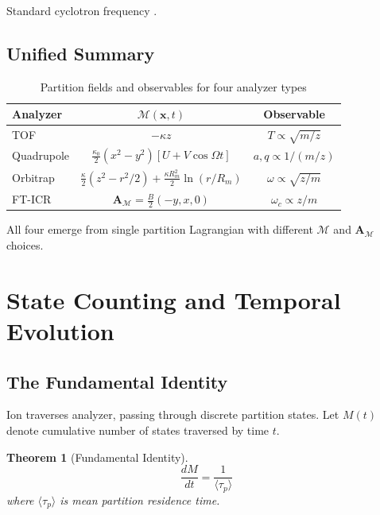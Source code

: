 \documentclass[twocolumn,10pt]{revtex4-2}
\newtheorem{theorem}{Theorem}[section]
\theoremstyle{definition}
\theoremstyle{remark}
\newcommand{\Mdepth}{\mathcal{M}}
\newcommand{\Apartition}{\mathbf{A}_{\Mdepth}}
\newcommand{\taup}{\tau_p}
\begin{document}
\noindent Standard cyclotron frequency \cite{Marshall1998}.

\subsection{Unified Summary}

\begin{table}[h]
\centering
\caption{Partition fields and observables for four analyzer types}
\label{tab:analyzers}
\begin{tabular}{lcc}
\toprule
\textbf{Analyzer} & \textbf{$\Mdepth(\mathbf{x}, t)$} & \textbf{Observable} \\
\midrule
TOF & $-\kappa z$ & $T \propto \sqrt{m/z}$ \\
Quadrupole & $\frac{\kappa_0}{2}(x^2-y^2)[U+V\cos\Omega t]$ & $a, q \propto 1/(m/z)$ \\
Orbitrap & $\frac{\kappa}{2}(z^2 - r^2/2) + \frac{\kappa R_m^2}{2}\ln(r/R_m)$ & $\omega \propto \sqrt{z/m}$ \\
FT-ICR & $\Apartition = \frac{B}{2}(-y, x, 0)$ & $\omega_c \propto z/m$ \\
\bottomrule
\end{tabular}
\end{table}

All four emerge from single partition Lagrangian with different $\Mdepth$ and $\Apartition$ choices.

\section{State Counting and Temporal Evolution}
\label{sec:state_counting}

\subsection{The Fundamental Identity}

Ion traverses analyzer, passing through discrete partition states. Let $M(t)$ denote cumulative number of states traversed by time $t$.

\begin{theorem}[Fundamental Identity]
\label{thm:fundamental}
\begin{equation}
\boxed{\frac{dM}{dt} = \frac{1}{\langle\taup\rangle}}
\label{eq:fundamental_identity}
\end{equation}
where $\langle\taup\rangle$ is mean partition residence time.
\end{theorem}
\end{document}
